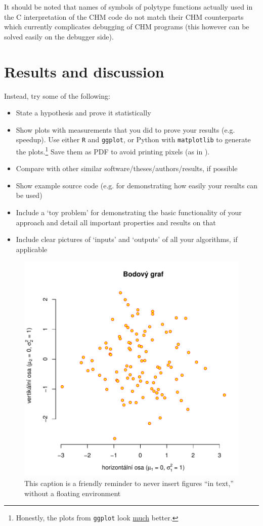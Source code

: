 It should be noted that names of symbols of polytype functions actually used in the C interpretation of the CHM code do not match their CHM counterparts which currently complicates debugging of CHM programs (this however can be solved easily on the debugger side).

\iffalse
\chapter{Results and discussion}

Instead, try some of the following:
\begin{itemize}
\item State a hypothesis and prove it statistically
\item Show plots with measurements that you did to prove your results (e.g. speedup). Use either \texttt{R} and \texttt{ggplot}, or Python with \texttt{matplotlib} to generate the plots.\footnote{Honestly, the plots from \texttt{ggplot} look \underline{much} better.} Save them as PDF to avoid printing pixels (as in ).
\item Compare with other similar software/theses/authors/results, if possible
\item Show example source code (e.g. for demonstrating how easily your results can be used)
\item Include a `toy problem' for demonstrating the basic functionality of your approach and detail all important properties and results on that
\item Include clear pictures of `inputs' and `outputs' of all your algorithms, if applicable
\end{itemize}

\begin{figure}
\centering
\includegraphics[width=.6\linewidth]{img/ukazka-obr01.pdf}
\caption{This caption is a friendly reminder to never insert figures ``in text,'' without a floating environment}
\label{fig:f}
\end{figure}

